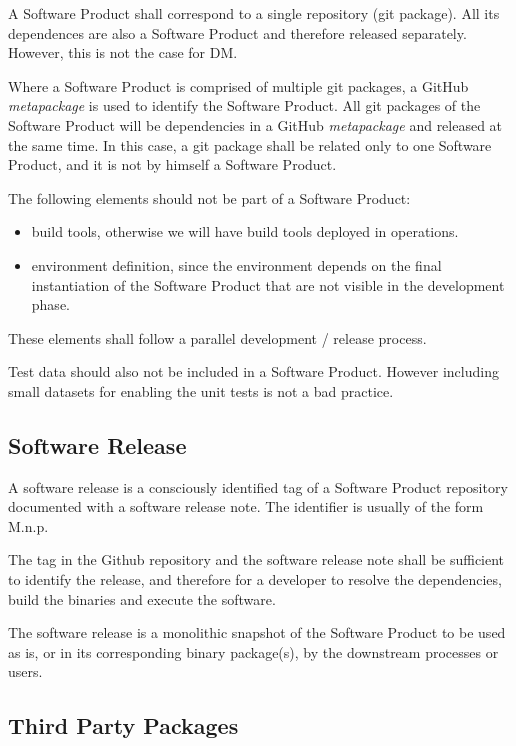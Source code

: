 A Software Product shall correspond to a single repository (git package). All its dependences are also a Software Product and therefore released separately. However, this is not the case for DM.

Where a Software Product is comprised of multiple git packages, a GitHub \textit{metapackage} is used to identify the Software Product.
All git packages of the Software Product will be dependencies in a GitHub \textit{metapackage} and released at the same time.
In this case, a git package shall be related only to one Software Product, and it is not by himself a Software Product.

The following elements should not be part of a Software Product:

\begin{itemize}
\item build tools, otherwise we will have build tools deployed in operations.
\item environment definition, since the environment depends on the final instantiation of the Software Product that are not visible in the development phase.
\end{itemize}

These elements shall follow a parallel development / release process.

Test data should also not be included in a Software Product. However including small datasets for enabling the unit tests is not a bad practice.


\subsection{Software Release} \label{sec:defrelease}

A software release is a consciously identified tag of a Software Product repository documented with a software release note.
The identifier is usually of the form M.n.p.

The tag in the Github repository and the software release note shall be sufficient to identify the release, and therefore for a developer
to resolve the dependencies, build the binaries and execute the software.

The software release is a monolithic snapshot of the Software Product to be used as is, or in its corresponding binary package(s), by the downstream processes or users.


\subsection{Third Party Packages}

